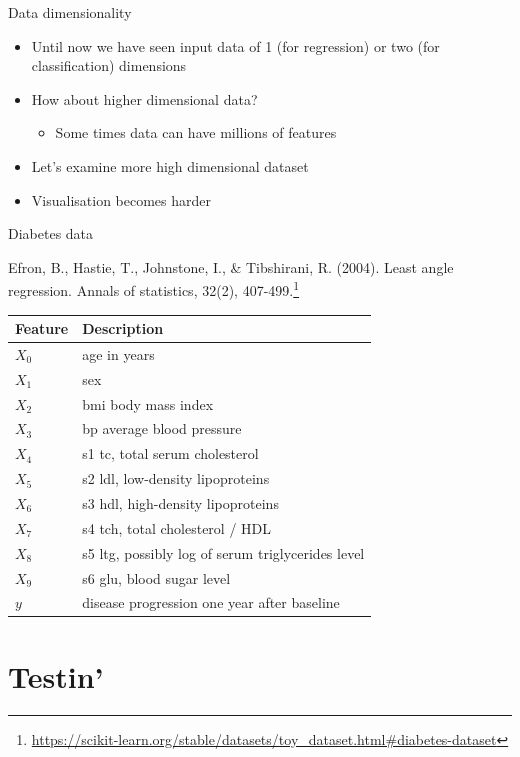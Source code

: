 \documentclass[obeyspaces,aspectratio=43]{beamer}
\renewcommand{\href}[2]{#2\footnote{\url{#1}}}
\providecommand{\tightlist}{%
  \setlength{\itemsep}{0pt}\setlength{\parskip}{0pt}}
\begin{document}
\begin{frame}{Data dimensionality}

\begin{itemize}
\tightlist
\item
  Until now we have seen input data of 1 (for regression) or two (for
  classification) dimensions
\item
  How about higher dimensional data?

  \begin{itemize}
  \tightlist
  \item
    Some times data can have millions of features
  \end{itemize}
\item
  Let's examine more high dimensional dataset
\item
  Visualisation becomes harder
\end{itemize}

\end{frame}

\begin{frame}{Diabetes data}

\href{https://scikit-learn.org/stable/datasets/toy_dataset.html\#diabetes-dataset}{Efron,
B., Hastie, T., Johnstone, I., \& Tibshirani, R. (2004). Least angle
regression. Annals of statistics, 32(2), 407-499.}

\tiny

\begin{longtable}[c]{@{}ll@{}}
\toprule
Feature & Description\tabularnewline
\midrule
\endhead
\(X_0\) & age in years\tabularnewline
\(X_1\) & sex\tabularnewline
\(X_2\) & bmi body mass index\tabularnewline
\(X_3\) & bp average blood pressure\tabularnewline
\(X_4\) & s1 tc, total serum cholesterol\tabularnewline
\(X_5\) & s2 ldl, low-density lipoproteins\tabularnewline
\(X_6\) & s3 hdl, high-density lipoproteins\tabularnewline
\(X_7\) & s4 tch, total cholesterol / HDL\tabularnewline
\(X_8\) & s5 ltg, possibly log of serum triglycerides
level\tabularnewline
\(X_9\) & s6 glu, blood sugar level\tabularnewline
\(y\) & disease progression one year after baseline\tabularnewline
\bottomrule
\end{longtable}

\end{frame}

\section{Testin'}\label{testin}
\end{document}

